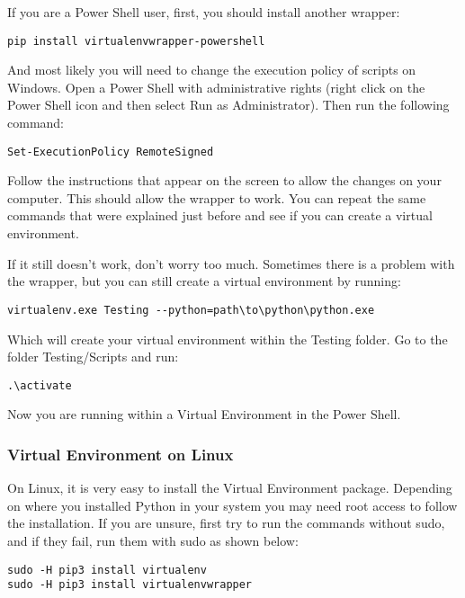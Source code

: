 
If you are a Power Shell user, first, you should install another wrapper:

\begin{verbatim}
pip install virtualenvwrapper-powershell
\end{verbatim}

And most likely you will need to change the execution policy of scripts on Windows. Open a Power Shell with administrative rights (right click on the Power Shell icon and then select Run as Administrator). Then run the following command:

\begin{verbatim}
Set-ExecutionPolicy RemoteSigned
\end{verbatim}

Follow the instructions that appear on the screen to allow the changes on your computer. This should allow the wrapper to work. You can repeat the same commands that were explained just before and see if you can create a virtual environment.

If it still doesn’t work, don’t worry too much. Sometimes there is a problem with the wrapper, but you can still create a virtual environment by running:
\begin{verbatim}
virtualenv.exe Testing --python=path\to\python\python.exe
\end{verbatim}

Which will create your virtual environment within the Testing folder. Go to the folder Testing/Scripts and run:
\begin{verbatim}
.\activate
\end{verbatim}

Now you are running within a Virtual Environment in the Power Shell.

\subsubsection{Virtual Environment on Linux}
On Linux, it is very easy to install the Virtual Environment package. Depending on where you installed Python in your system you may need root access to follow the installation. If you are unsure, first try to run the commands without sudo, and if they fail, run them with sudo as shown below:

\begin{verbatim}
sudo -H pip3 install virtualenv
sudo -H pip3 install virtualenvwrapper
\end{verbatim}


